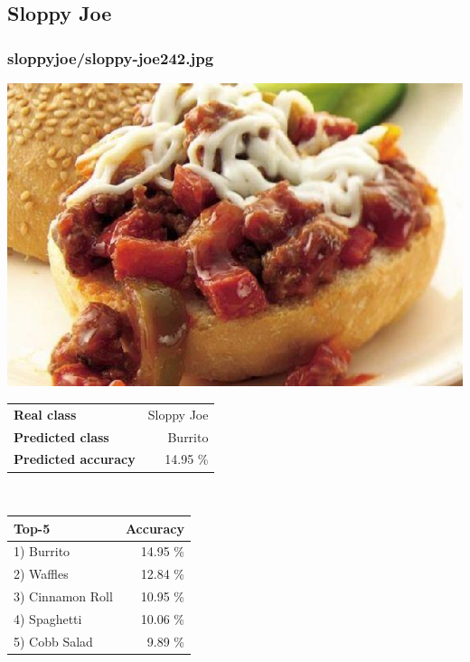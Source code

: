 \subsection{Sloppy Joe}
    
\subsubsection{sloppy\textunderscore joe/sloppy-joe242.jpg}

\begin{minipage}[t]{0.4\textwidth}
	\vspace{0pt}
	\includegraphics[width=\linewidth]{images/evaluation-images/sloppy_joe/sloppy-joe242.jpg}
\end{minipage}
\hfill
\begin{minipage}[t]{0.5\textwidth}
	\vspace{0pt}\raggedright
	\begin{tabularx}{\textwidth}{X r}
		\small \textbf{Real class} & \small Sloppy Joe\\
		\small \textbf{Predicted class} & \small Burrito\\
		\small \textbf{Predicted accuracy} & \small 14.95 \%
    \end{tabularx}\\
    
    \vspace{6pt}
	\begin{tabularx}{\textwidth}{X r}
        \small \textbf{Top-5} & \small \textbf{Accuracy} \\
        \hline
		\small 1) Burrito & \small 14.95 \%\\\small 2) Waffles & \small 12.84 \%\\\small 3) Cinnamon Roll & \small 10.95 \%\\\small 4) Spaghetti & \small 10.06 \%\\\small 5) Cobb Salad & \small 9.89 \%
    \end{tabularx}
\end{minipage}
    
